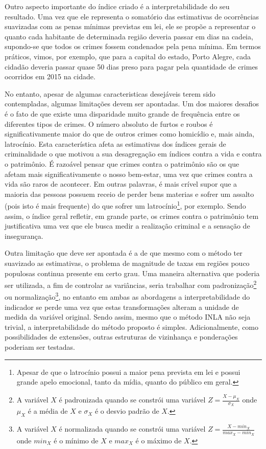 \documentclass[12pt,openright,oneside,a4paper,english,french,spanish]{abntex2}
\numberwithin{table}{section} %
\numberwithin{figure}{section} %
\begin{document}
Outro aspecto importante do índice criado é a interpretabilidade do seu resultado. Uma vez que ele representa o somatório das estimativas de ocorrências suavizadas com as penas mínimas previstas em lei, ele se propõe a representar o quanto cada habitante de determinada região deveria passar em dias na cadeia, supondo-se que todos os crimes fossem condenados pela pena mínima. Em termos práticos, vimos, por exemplo, que para a capital do estado, Porto Alegre, cada cidadão deveria passar quase 50 dias preso para pagar pela quantidade de crimes ocorridos em 2015 na cidade. 

No entanto, apesar de algumas caracteristicas desejáveis terem sido contempladas, algumas limitações devem ser apontadas. Um dos maiores desafios é o fato de que existe uma disparidade muito grande de frequência entre os diferentes tipos de crimes. O número absoluto de furtos e roubos é significativamente maior do que de outros crimes como homicídio e, mais ainda, latrocínio. Esta característica afeta as estimativas dos índices gerais de criminalidade o que motivou a sua desagregação em índices contra a vida e contra o patrimônio. É razoável pensar que crimes contra o patrimônio são os que afetam mais significativamente o nosso bem-estar, uma vez que crimes contra a vida são raros de acontecer. Em outras palavras, é mais crível supor que a maioria das pessoas possuem receio de perder bens materias e sofrer um assalto (pois isto é mais frequente) do que sofrer um latrocínio\footnote{Apesar de que o latrocínio possui a maior pena prevista em lei e possui grande apelo emocional, tanto da mídia, quanto do público em geral.}, por exemplo. Sendo assim, o índice geral refletir, em grande parte, os crimes contra o patrimônio tem justificativa uma vez que ele busca medir a realização criminal e a sensação de insegurança.

Outra limitação que deve ser apontada é a de que mesmo com o método ter suavizado as estimativas, o problema de magnitude de taxas em regiões pouco populosas continua presente em certo grau. Uma maneira alternativa que poderia ser utilizada, a fim de controlar as variâncias, seria trabalhar com padronização\footnote{A variável $X$ é padronizada quando se constrói uma variável $Z=\frac{X-\mu_{X}}{\sigma_{X}}$ onde $\mu_{X}$ é a média de $X$ e $\sigma_{X}$ é o desvio padrão de $X$.} ou normalização\footnote{A variável $X$ é normalizada quando se constrói uma variável $Z=\frac{X-min_{X}}{max_{X}-min_{X}}$ onde $min_{X}$ é o mínimo de $X$ e $max_{X}$ é o máximo de $X$.}, no entanto em ambas as abordagens a interpretabilidade do indicador se perde uma vez que estas transformações alteram a unidade de medida da variável original. Sendo assim, mesmo que o método INLA não seja trivial, a interpretabilidade do método proposto é simples. Adicionalmente, como possibilidades de extensões, outras estruturas de vizinhança e ponderações poderiam ser testadas.
\end{document}
